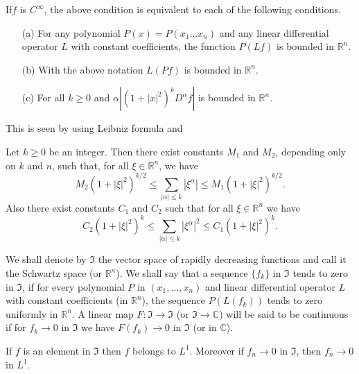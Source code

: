 If\pageoriginale $f$ is $C^{\infty}$, the above condition is
equivalent to each of the following conditions.
\begin{itemize}
\item[(a)] For any polynomial $P(x)=P(x_{1}\ldots x_{n})$ and any
  linear differential operator $L$ with constant coefficients, the
  function $P(Lf)$ is bounded in $\mathbb{R}^{n}$.

\item[(b)] With the above notation $L(Pf)$ is bounded in
  $\mathbb{R}^{n}$.

\item[(c)] For all $k\geq 0$ and $\alpha |(1+|x|^{2})^{k}D^{\alpha}f|$
  is bounded in $\mathbb{R}^{n}$.
\end{itemize}

This is seen by using Leibniz formula and

\begin{exer*}
Let $k\geq 0$ be an integer. Then there exist constants $M_{1}$ and
$M_{2}$, depending only on $k$ and $n$, such that, for all $\xi\in
\mathbb{R}^{n}$, we have
$$
M_{2}(1+|\xi|^{2})^{k/2}\leq \sum\limits_{|\alpha|\leq
  k}|\xi^{\alpha}|\leq M_{1}(1+|\xi|^{2})^{k/2}.
$$
Also there exist constants $C_{1}$ and $C_{2}$ such that for all $\xi
\in \mathbb{R}^{n}$ we have
$$
C_{2}(1+|\xi|^{2})^{k}\leq \sum\limits_{|\alpha|\leq
  k}|\xi^{\alpha}|^{2}\leq C_{1}(1+|\xi|^{2})^{k}.
$$

We shall denote by $\mathfrak{I}$ the vector space of rapidly
decreasing functions and call it the Schwartz space (or
$\mathbb{R}^{n}$). We shall say that a sequence $\{f_{k}\}$ in
$\mathfrak{I}$ tends to zero in $\mathfrak{I}$, if for every
polynomial $P$ in $(x_{1},\ldots,x_{n})$ and linear differential
operator $L$ with constant coefficients (in $\mathbb{R}^{n}$), the
sequence $P(L(f_{k}))$ tends to zero uniformly in $\mathbb{R}^{n}$. A
linear map $F:\mathfrak{I}\to \mathfrak{I}$ (or $\mathfrak{I}\to
\mathbb{C}$) will be said to be continuous if for $f_{k}\to 0$ in
$\mathfrak{I}$ we have $F(f_{k})\to 0$ in $\mathfrak{I}$ (or in $\mathbb{C}$).
\end{exer*}

\begin{proposition}\label{chap4-prop2}
If $f$ is an element in $\mathfrak{I}$ then $f$ belongs to
$L^{1}$. Moreover if $f_{n}\to 0$ in $\mathfrak{I}$, then $f_{n}\to 0$
in $L^{1}$.
\end{proposition}

